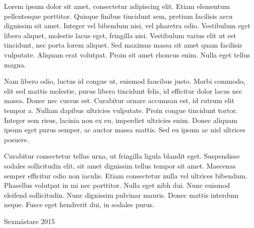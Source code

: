 \documentclass[../main/handlingar.tex]{subfiles}
\begin{document}

Lorem ipsum dolor sit amet, consectetur adipiscing elit. Etiam elementum pellentesque porttitor. Quisque finibus tincidunt sem, pretium facilisis arcu dignissim sit amet. Integer vel bibendum nisi, vel pharetra odio. Vestibulum eget libero aliquet, molestie lacus eget, fringilla nisi. Vestibulum varius elit ut est tincidunt, nec porta lorem aliquet. Sed maximus massa sit amet quam facilisis vulputate. Aliquam erat volutpat. Proin sit amet rhoncus enim. Nulla eget tellus magna.

Nam libero odio, luctus id congue ut, euismod faucibus justo. Morbi commodo, elit sed mattis molestie, purus libero tincidunt felis, id efficitur dolor lacus nec massa. Donec nec cursus est. Curabitur ornare accumsan est, id rutrum elit tempor a. Nullam dapibus ultricies vulputate. Proin congue tincidunt tortor. Integer sem risus, lacinia non ex eu, imperdiet ultricies enim. Donec aliquam ipsum eget purus semper, ac auctor massa mattis. Sed eu ipsum ac nisl ultrices posuere.

Curabitur consectetur tellus urna, ut fringilla ligula blandit eget. Suspendisse sodales sollicitudin elit, sit amet dignissim tellus tempor sit amet. Maecenas semper efficitur odio non iaculis. Etiam consectetur nulla vel ultrices bibendum. Phasellus volutpat in mi nec porttitor. Nulla eget nibh dui. Nunc euismod eleifend sollicitudin. Nunc dignissim pulvinar mauris. Donec mattis interdum neque. Fusce eget hendrerit dui, in sodales purus.

\begin{signatures}{1}
    \mvh
    \signature{Adam Waks}{Sexmästare 2015}
\end{signatures}
\end{document}
